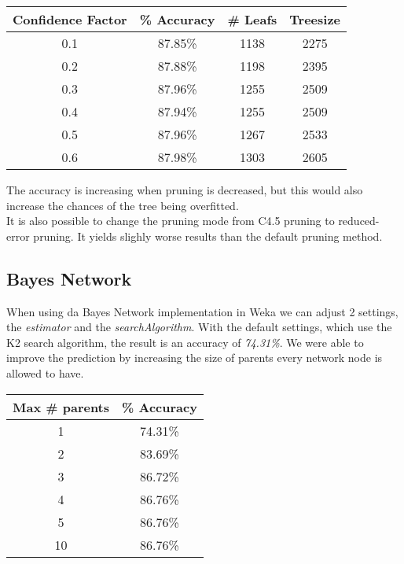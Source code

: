 \documentclass{article}
\begin{document}
 
 \begin{center}
 \begin{tabular}{ c | c | c | c}
 \textbf{Confidence Factor} & \textbf{\% Accuracy} & \textbf{\# Leafs} & \textbf{Treesize}\\
 \hline
 0.1 & 87.85\% & 1138 & 2275\\
 0.2 & 87.88\% & 1198 & 2395\\
 0.3 & 87.96\% & 1255 & 2509\\
 0.4 & 87.94\% & 1255 & 2509\\
 0.5 & 87.96\% & 1267 & 2533\\
 0.6 & 87.98\% & 1303 & 2605\\
 \end{tabular}
 \end{center}
 
 The accuracy is increasing when pruning is decreased, but this would also increase the chances of the tree being overfitted.\\
 It is also possible to change the pruning mode from C4.5 pruning to reduced-error pruning. It yields slighly worse results than the default pruning method.
 
 

\subsection{Bayes Network}
When using da Bayes Network implementation in Weka we can adjust 2 settings, the \emph{estimator} and the \emph{searchAlgorithm}. With the default settings, which use the K2 search algorithm, the result is an accuracy of \emph{74.31\%}. We were able to improve the prediction by increasing the size of parents every network node is allowed to have.

\begin{center}
\begin{tabular}{ c | c }
\textbf{Max \# parents} & \textbf{\% Accuracy} \\
\hline
1  & 74.31\% \\
2  & 83.69\% \\
3  & 86.72\% \\
4  & 86.76\% \\
5  & 86.76\% \\
10 & 86.76\% \\
\end{tabular}
\end{center}
\end{document}
